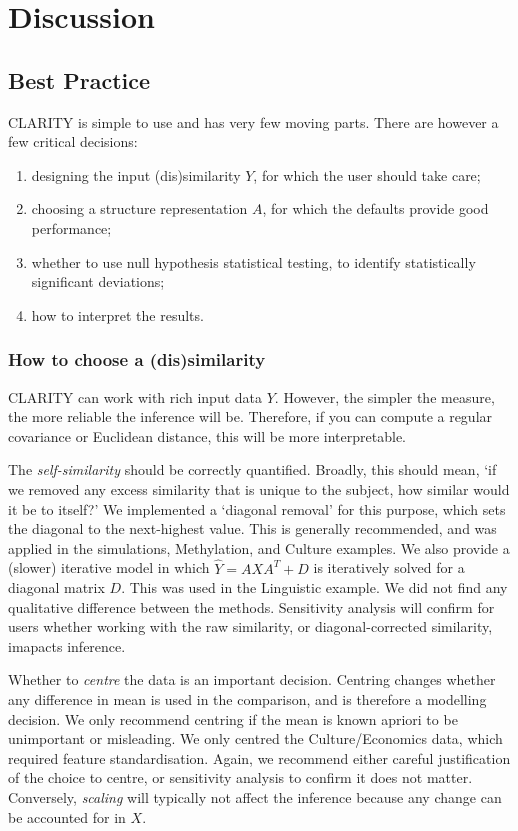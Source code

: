 \documentclass[a4]{article}
\newcommand{\+}[1]{\mathbf{#1}}
\begin{document}
\section{Discussion}

\subsection{Best Practice}
\label{sec:bestpractice}

CLARITY is simple to use and has very few moving parts. There are however a few critical decisions:
\begin{enumerate}
\item designing the input (dis)similarity $Y$, for which the user should take care;
\item choosing a structure representation $A$, for which the defaults provide good performance;
\item whether to use null hypothesis statistical testing, to identify statistically significant deviations;
\item how to interpret the results.
\end{enumerate}

\subsubsection{How to choose a (dis)similarity}

CLARITY can work with rich input data $Y$. However, the simpler the measure, the more reliable the inference will be. Therefore, if you can compute a regular covariance or Euclidean distance, this will be more interpretable.

The \emph{self-similarity} should be correctly quantified. Broadly, this should mean, `if we removed any excess similarity that is unique to the subject, how similar would it be to itself?' We implemented a `diagonal removal' for this purpose, which sets the diagonal to the next-highest value. This is generally recommended, and was applied in the simulations, Methylation, and Culture examples. We also provide a (slower) iterative model in which $\hat{Y}=AX A^T+D$ is iteratively solved for a diagonal matrix $D$. This was used in the Linguistic example. We did not find any qualitative difference between the methods. Sensitivity analysis will confirm for users whether working with the raw similarity, or diagonal-corrected similarity, imapacts inference.

Whether to \emph{centre} the data is an important decision. Centring changes whether any difference in mean is used in the comparison, and is therefore a modelling decision. We only recommend centring if the mean is known apriori to be unimportant or misleading. We only centred the Culture/Economics data, which required feature standardisation. Again, we recommend either careful justification of the choice to centre, or sensitivity analysis to confirm it does not matter. Conversely, \emph{scaling} will typically not affect the inference because any change can be accounted for in $X$.
\end{document}
